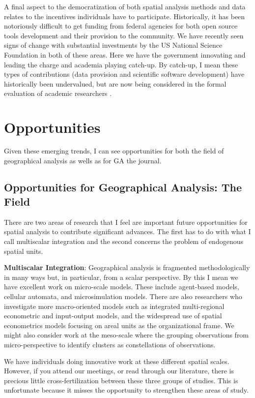 \documentclass[11pt]{article}
\begin{document}
A final aspect to the democratization of both spatial analysis methods and data
relates to the incentives individuals have to participate. Historically, it has
been notoriously difficult to get funding from federal agencies for both open
source tools development and their provision to the community. We have recently
seen signs of change with substantial investments by the US National Science
Foundation in both of these areas. Here we have the government innovating and
leading the charge and academia playing catch-up. By catch-up, I mean these
types of contributions (data provision and scientific software development) have
historically been undervalued, but are now being considered in the formal
evaluation of academic researchers \cite{eghbal2016roads}.

\section{Opportunities}
\label{sec:org000df0f}
Given these emerging trends, I can see opportunities for both the field of
geographical analysis as wells as for GA the journal.
\subsection{Opportunities for Geographical Analysis: The Field}
\label{sec:org52b49a6}
There are two areas of research that I feel are important future
opportunities for spatial analysis to contribute significant advances. The
first has to do with what I call multiscalar integration and the second
concerns the problem of endogenous spatial units.

\textbf{Multiscalar Integration}: Geographical analysis is fragmented methodologically
in many ways but, in particular, from a scalar perspective. By this I mean we
have excellent work  on micro-scale models. These include agent-based
models, cellular automata, and microsimulation models. There are also
researchers who investigate more macro-oriented models such as integrated
multi-regional econometric and input-output models, and the widespread use of
spatial econometrics models  focusing on areal units as the
organizational frame. We might also consider work at the meso-scale where
the grouping observations from micro-perspective to identify clusters
as constellations of observations.

We have individuals doing innovative work at these different spatial scales.
However, if you attend our meetings, or read through our literature, there is
precious little cross-fertilization between these three groups of studies. This
is unfortunate because it misses the opportunity to strengthen these areas of
study.
\end{document}

